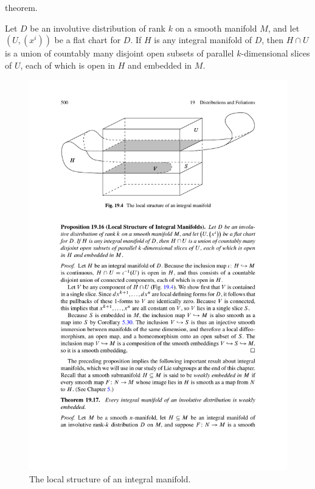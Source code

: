 theorem.
\begin{proposition}\label{integral mani local struct}
Let $D$ be an involutive distribution of rank $k$ on a smooth manifold $M$, and let $(U,(x^i))$ be a flat chart for $D$. If $H$ is any integral manifold of $D$, then $H\cap U$ is a union of countably many disjoint open subsets of parallel $k$-dimensional slices of $U$, each of which is open in $H$ and embedded in $M$.
\end{proposition}
\begin{figure}[htbp]
\centering
\includegraphics{pictures/local-struct}
\caption{The local structure of an integral manifold.}
\end{figure}
